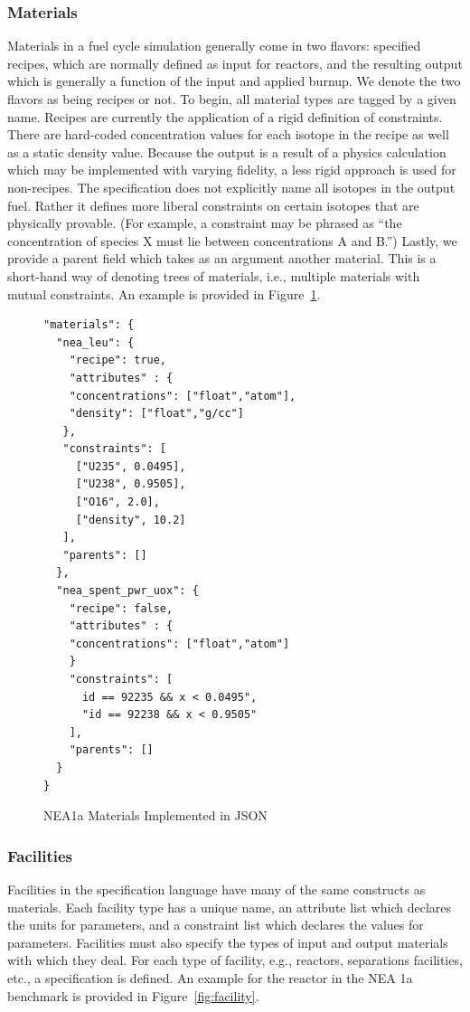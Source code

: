 \subsubsection{Materials}
Materials in a fuel cycle simulation generally come in two flavors: specified
recipes, which are normally defined as input for reactors, and the resulting
output which is generally a function of the input and applied burnup. We denote
the two flavors as being recipes or not. To begin, all material types are tagged
by a given name. Recipes are currently the application of a rigid definition of
constraints. There are hard-coded concentration values for each isotope in the
recipe as well as a static density value. Because the output is a result of a
physics calculation which may be implemented with varying fidelity, a less rigid
approach is used for non-recipes. The specification does not explicitly name all
isotopes in the output fuel. Rather it defines more liberal constraints on
certain isotopes that are physically provable.  (For example, a constraint may
be phrased as ``the concentration of species X must lie between concentrations A
and B.'') Lastly, we provide a parent field which takes as an argument another
material. This is a short-hand way of denoting trees of materials, i.e.,
multiple materials with mutual constraints. An example is provided in
Figure~\ref{fig:material}.

\begin{figure}[h!]
\begin{Verbatim}[frame=single]
"materials": {
  "nea_leu": {
    "recipe": true,
    "attributes" : {
    "concentrations": ["float","atom"],
    "density": ["float","g/cc"]
   },
   "constraints": [        
     ["U235", 0.0495],
     ["U238", 0.9505],
     ["O16", 2.0],
     ["density", 10.2]
   ], 
   "parents": []
  },
  "nea_spent_pwr_uox": {
    "recipe": false,
    "attributes" : {
    "concentrations": ["float","atom"]
    }
    "constraints": [
      id == 92235 && x < 0.0495",
      "id == 92238 && x < 0.9505"
    ], 
    "parents": []
  }
}
\end{Verbatim}
\caption{NEA1a Materials Implemented in JSON}
\label{fig:material}
\end{figure}

\subsubsection{Facilities}
Facilities in the specification language have many of the same constructs as
materials. Each facility type has a unique name, an attribute list which
declares the units for parameters, and a constraint list which declares the
values for parameters. Facilities must also specify the types of input and
output materials with which they deal. For each type of facility, e.g., reactors,
separations facilities, etc., a specification is defined. An example for the
reactor in the NEA 1a benchmark is provided in Figure~\ref{fig:facility}.

